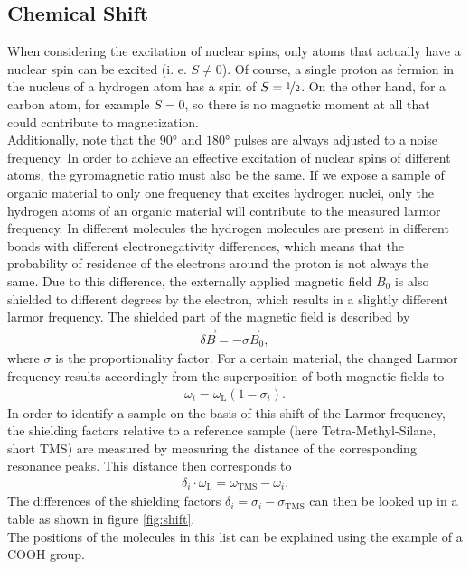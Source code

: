 \subsection{Chemical Shift}
When considering the excitation of nuclear spins, only atoms that actually have a nuclear spin can be excited (i. e. $S\neq 0$).
Of course, a single proton as fermion in the nucleus of a hydrogen atom has a spin of $S = \nicefrac{1}{2}$.
On the other hand, for a carbon atom, for example $S = 0$, so there is no magnetic moment at all that could contribute to magnetization.\\
Additionally, note that the $\ang{90}$ and $\ang{180}$ pulses are always adjusted to a noise frequency.
In order to achieve an effective excitation of nuclear spins of different atoms, the gyromagnetic ratio must also be the same.
If we expose a sample of organic material to only one frequency that excites hydrogen nuclei, only the hydrogen atoms of an organic material will contribute to the measured larmor frequency.
In different molecules the hydrogen molecules are present in different bonds with different electronegativity differences, which means that the probability of residence of the electrons around the proton is not always the same.
Due to this difference, the externally applied magnetic field $B_0$ is also shielded to different degrees by the electron, which results in a slightly different larmor frequency.
The shielded part of the magnetic field is described by
\begin{align}
\delta\vec{B}=-\sigma\vec{B}_0,
\end{align}
where $\sigma$ is the proportionality factor.
For a certain material, the changed Larmor frequency results accordingly from the superposition of both magnetic fields to
\begin{align}
\omega_i=\omega_\text{L}(1-\sigma_i).
\end{align}
In order to identify a sample on the basis of this shift of the Larmor frequency, the shielding factors relative to a reference sample (here Tetra-Methyl-Silane, short TMS) are measured by measuring the distance of the corresponding resonance peaks.
This distance then corresponds to
\begin{align}
\delta_i\cdot\omega_\text{L}=\omega_\text{TMS}-\omega_i.
\label{eq:shift}
\end{align}
The differences of the shielding factors $\delta_i =\sigma_i-\sigma_\text{TMS}$ can then be looked up in a table as shown in figure \ref{fig:shift}.\\
The positions of the molecules in this list can be explained using the example of a COOH group.
